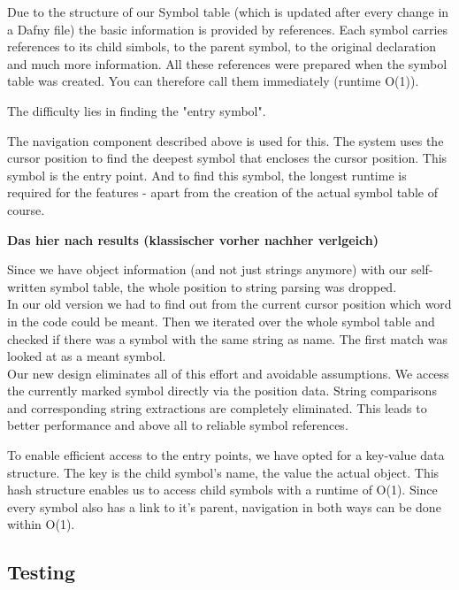 Due to the structure of our Symbol table (which is updated after every change in a Dafny file)
the basic information is provided by references.
Each symbol carries references to its child simbols, to the parent symbol, to the original declaration and much more information.
All these references were prepared when the symbol table was created. You can therefore call them immediately (runtime O(1)).  

The difficulty lies in finding the "entry symbol".

The navigation component described above is used for this. The system uses the cursor position to find the deepest symbol that encloses the cursor position. This symbol is the entry point. And to find this symbol, the longest runtime is required for the features - apart from the creation of the actual symbol table of course.

\textbf{Das hier nach results (klassischer vorher nachher verlgeich)}

Since we have object information (and not just strings anymore) with our self-written symbol table,
the whole position to string parsing was dropped. \\

In our old version we had to find out from the current cursor position which word in the code could be meant.
Then we iterated over the whole symbol table and checked if there was a symbol with the same string as name.
The first match was looked at as a meant symbol. \\

Our new design eliminates all of this effort and avoidable assumptions.
We access the currently marked symbol directly via the position data.
String comparisons and corresponding string extractions are completely eliminated.
This leads to better performance and above all to reliable symbol references.

To enable efficient access to the entry points, we have opted for a key-value data structure. The key is the child symbol's name, the value the actual  object.
This hash structure enables us to access child symbols with a runtime of O(1). Since every symbol also has a link to it's parent, navigation in both ways can be done within O(1).



\subsection{Testing}

